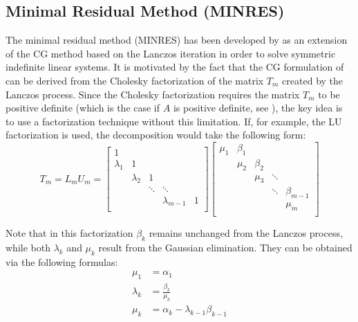 \subsection{Minimal Residual Method (MINRES)}
\label{sec:minres}
The minimal residual method (MINRES) has been developed by \cite{paige_solution_1975} as an extension of the CG method based on the Lanczos iteration in order to solve symmetric indefinite linear systems. It is motivated by the fact that the CG formulation of \cite{hestenes_methods_1952} can be derived from the Cholesky factorization of the matrix $T_m$ created by the Lanczos process. Since the Cholesky factorization requires the matrix $T_m$ to be positive definite (which is the case if $A$ is positive definite, see \cite{paige_solution_1975}), the key idea is to use a factorization technique without this limitation. If, for example, the LU factorization is used, the decomposition would take the following form:
\begin{equation}
       T_m = L_m U_m=
  \left[
    \begin{array}{ccccc}
      1 &  & & & \\
      \lambda_1 & 1 &  & & \\
      & \lambda_2 & 1 &  & \\
       & &\ddots &\ddots & \\
       & & &\lambda_{m-1} &1 \\
    \end{array}
  \right] 
  \left[
    \begin{array}{ccccc}
      \mu_1 & \beta_1 & & & \\
       & \mu_2 & \beta_2  & & \\
      &  & \mu_3 & \ddots  & \\
       & & &\ddots &\beta_{m-1} \\
       & & & &\mu_{m} \\
    \end{array}
  \right] 
\end{equation}

\noindent Note that in this factorization $\beta_k$ remains unchanged from the Lanczos process, while both $\lambda_k$ and $\mu_k$ result from the Gaussian elimination. They can be obtained via the following formulas:
\begin{equation}
    \begin{aligned}
    \mu_1 &= \alpha_1\\
    \lambda_k &= \frac{\beta_k}{\mu_{k}} \\
      \mu_k & = \alpha_k-\lambda_{k-1}\beta_{k-1}
    \end{aligned}
\end{equation}


